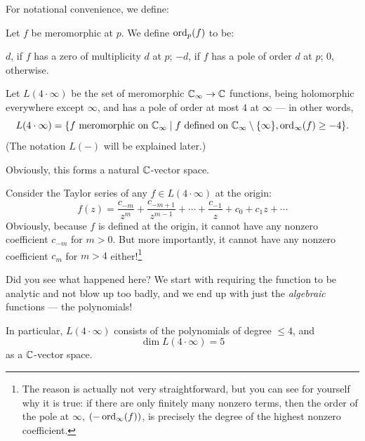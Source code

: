 For notational convenience, we define:
\begin{definition}
	Let $f$ be meromorphic at $p$. We define $\operatorname{ord}_p(f)$ to be:
	\begin{itemize}
		\ii $d$, if $f$ has a zero of multiplicity $d$ at $p$;
		\ii $-d$, if $f$ has a pole of order $d$ at $p$;
		\ii $0$, otherwise.
	\end{itemize}
\end{definition}

\begin{example}
	Let $L(4 \cdot \infty)$ be the set of meromorphic $\mathbb C_\infty \to \mathbb C$ functions, being
	holomorphic everywhere except $\infty$, and has a pole of order at most $4$ at $\infty$ ---
	in other words,
	\[
		L(4 \cdot \infty) = \{ \text{$f$ meromorphic on $\mathbb C_\infty$} \mid \text{$f$ defined on
		$\mathbb C_\infty \setminus \{ \infty \}$}, \operatorname{ord}_\infty(f) \geq -4 \}.
	\]
	(The notation $L(-)$ will be explained later.)

	Obviously, this forms a natural $\mathbb C$-vector space.

	Consider the Taylor series of any $f \in L(4 \cdot \infty)$ at the origin:
	\[
		f(z) = \frac{c_{-m}}{z^m} + \frac{c_{-m+1}}{z^{m-1}} + \cdots + \frac{c_{-1}}{z} + c_0 +
		c_1 z + \cdots
	\]
	Obviously, because $f$ is defined at the origin, it cannot have any nonzero coefficient $c_{-m}$
	for $m > 0$.
	But more importantly, it cannot have any nonzero coefficient $c_m$ for $m > 4$
	either!\footnote{The reason is actually not very straightforward, but you can see for yourself
		why it is true: if there are only finitely many nonzero terms, then the order of the pole at
		$\infty$, $(-\operatorname{ord}_\infty(f))$, is precisely the degree of the highest nonzero coefficient.}

	Did you see what happened here? We start with requiring the function to be analytic and not
	blow up too badly, and we end up with just the \emph{algebraic} functions --- the polynomials!

	In particular, $L(4 \cdot \infty)$ consists of the polynomials of degree $\leq 4$, and
	\[
		\dim L(4 \cdot \infty) = 5
	\]
	as a $\mathbb C$-vector space.
\end{example}

